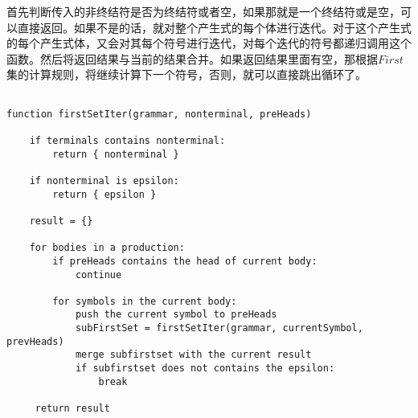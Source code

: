 首先判断传入的非终结符是否为终结符或者空，如果那就是一个终结符或是空，可以直接返回。如果不是的话，就对整个产生式的每个体进行迭代。对于这个产生式的每个产生式体，又会对其每个符号进行迭代，对每个迭代的符号都递归调用这个函数。然后将返回结果与当前的结果合并。如果返回结果里面有空，那根据$First$集的计算规则，将继续计算下一个符号，否则，就可以直接跳出循环了。

\begin{verbatim}

function firstSetIter(grammar, nonterminal, preHeads)

    if terminals contains nonterminal:
        return { nonterminal }

    if nonterminal is epsilon:
        return { epsilon }

    result = {}

    for bodies in a production:
        if preHeads contains the head of current body:
            continue
            
        for symbols in the current body:
            push the current symbol to preHeads
            subFirstSet = firstSetIter(grammar, currentSymbol, prevHeads)
            merge subfirstset with the current result
            if subfirstset does not contains the epsilon:
                break

     return result

\end{verbatim}


\newpage

